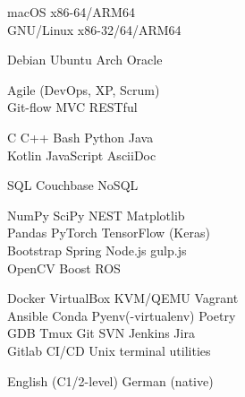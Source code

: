 \documentclass[a4paper]{resume-cv}
\begin{document}
\begin{minipage}[t]{0.42\textwidth}
	\faApple\space\space macOS x86-64/ARM64\\
	\faLinux\space GNU/Linux x86-32/64/ARM64
	\subsectionsep

	Debian \bulletsep Ubuntu \bulletsep Arch \bulletsep Oracle
	\subsectionsep
	
	Agile (DevOps, XP, Scrum)\\
	Git-flow \bulletsep MVC \bulletsep RESTful
	\subsectionsep

	C \bulletsep C++ \bulletsep Bash \bulletsep Python \bulletsep Java \\
	Kotlin \bulletsep JavaScript \bulletsep AsciiDoc \bulletsep \latex
	\subsectionsep
	
	SQL \bulletsep Couchbase NoSQL
	\subsectionsep

	NumPy \bulletsep SciPy \bulletsep NEST \bulletsep Matplotlib\\
	Pandas \bulletsep PyTorch \bulletsep TensorFlow (Keras)\\
	Bootstrap \bulletsep Spring \bulletsep Node.js \bulletsep gulp.js\\
	OpenCV \bulletsep Boost \bulletsep ROS
	\subsectionsep

	Docker \bulletsep VirtualBox \bulletsep KVM/QEMU \bulletsep Vagrant\\
	Ansible \bulletsep Conda \bulletsep Pyenv(-virtualenv) \bulletsep Poetry\\ 
	GDB \bulletsep Tmux \bulletsep Git \bulletsep SVN \bulletsep Jenkins \bulletsep Jira\\
	Gitlab CI/CD \bulletsep Unix terminal utilities
	\subsectionsep
	
	English (C1/2-level) \bulletsep German (native)

\end{minipage}\quad %
\hfill %
\end{document}

